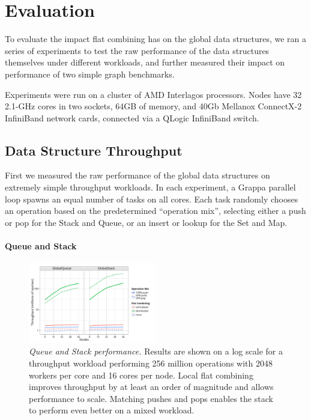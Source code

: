 \section{Evaluation}
To evaluate the impact flat combining has on the global data structures, we ran a series of experiments to test the raw performance of the data structures themselves under different workloads, and further measured their impact on performance of two simple graph benchmarks.

Experiments were run on a cluster of AMD Interlagos processors. Nodes have 32 2.1-GHz cores in two sockets, 64GB of memory, and 40Gb Mellanox ConnectX-2 InfiniBand network cards, connected via a QLogic InfiniBand switch.

\subsection{Data Structure Throughput}
First we measured the raw performance of the global data structures on extremely simple throughput workloads. In each experiment, a Grappa parallel loop spawns an equal number of tasks on all cores. Each task randomly chooses an operation based on the predetermined ``operation mix'', selecting either a push or pop for the Stack and Queue, or an insert or lookup for the Set and Map.

\paragraph{Queue and Stack}
\begin{figure}[t]
  \centering
  \includegraphics[width=0.5\textwidth]{data/plots/vector_perf.pdf}
  \caption{\emph{Queue and Stack performance.}
    Results are shown on a log scale for a throughput workload performing 256 million operations with 2048 workers per core and 16 cores per node. Local flat combining improves throughput by at least an order of magnitude and allows performance to scale. Matching pushes and pops enables the stack to perform even better on a mixed workload.
  }
  \label{fig:vector}
\end{figure}

